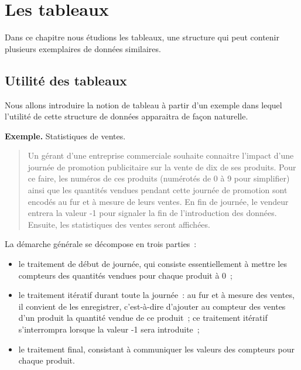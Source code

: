\chapter{Les tableaux}

	Dans ce chapitre nous étudions les tableaux, 
	une structure qui peut contenir 
	plusieurs exemplaires de données similaires.

	\section{Utilité des tableaux}
	
		Nous allons introduire la notion de tableau à partir d’un exemple 
		dans lequel l’utilité de cette structure de données 
		apparaitra de façon naturelle.
	
		\textbf{Exemple.}
		Statistiques de ventes.
		\begin{quote}	
			Un gérant d’une entreprise commerciale 
			souhaite connaitre l’impact 
			d’une journée de promotion publicitaire 
			sur la vente de dix de ses produits.
			Pour ce faire, les numéros de ces produits 
			(numérotés de 0 à 9 pour simplifier) 
			ainsi que les quantités vendues 
			pendant cette journée de promotion 
			sont encodés au fur et à mesure de leurs ventes. 
			En fin de journée, 
			le vendeur entrera la valeur -1 
			pour signaler la fin de l’introduction des données. 
			Ensuite, les statistiques des ventes seront affichées.
		\end{quote}
	
		La démarche générale se décompose en trois parties~:
		\begin{itemize}
		\item
			le traitement de début de journée, qui consiste essentiellement à mettre
			les compteurs des quantités vendues pour chaque produit à 0~;
		\item
			le traitement itératif durant toute la journée~: 
			au fur et à mesure des ventes, 
			il convient de les enregistrer, 
			c’est-à-dire d’ajouter au compteur des ventes d’un produit 
			la quantité vendue de ce produit~; 
			ce traitement itératif s’interrompra 
			lorsque la valeur -1 sera introduite~;
		\item
			le traitement final, consistant à communiquer les valeurs des compteurs
			pour chaque produit.
		\end{itemize}
	
